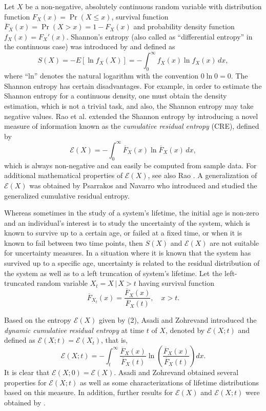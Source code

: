 \documentclass[11pt]{article}
\begin{document}
Let $X$ be a non-negative, absolutely continuous random variable with distribution function $F_X (x)=\Pr(X\leq x)$, survival function $\overline{F}_X (x)=\Pr(X>x)=1-F_X(x)$ and probability density function $f_X (x)=F_X'(x)$. Shannon's entropy (also called as “differential entropy” in the continuous case) was introduced by \cite{Shannon1948} and defined as  
\begin{equation} \textstyle
	S(X)=-E[\ln f_X (X)]=-\int_0^\infty f_X (x)\ln f_X (x)\,dx,
\end{equation}
where “ln” denotes the natural logarithm with the convention $0\ln 0=0$. The Shannon entropy has certain disadvantages. For example, in order to estimate the Shannon entropy for a continuous density, one must obtain the density estimation, which is not a trivial task, and also, the Shannon entropy may take negative values. Rao et al. \cite{Rao2004} extended the Shannon entropy by introducing a novel measure of information known as the \textit{cumulative residual entropy} (CRE), defined by
\begin{equation} \textstyle
	\mathcal{E}(X)=-\int_0^\infty \overline{F}_X (x)\ln \overline{F}_X (x)\,dx,
\end{equation}
which is always non-negative and can easily be computed from sample data. For additional mathematical properties of $\mathcal{E}(X)$, see also Rao \cite{Rao2005}. A generalization of $\mathcal{E}(X)$ was obtained by Psarrakos and Navarro \cite{Psarrakos2013} who introduced and studied the generalized cumulative residual entropy. 

Whereas sometimes in the study of a system's lifetime, the initial age is non-zero and an individual’s interest is to study the uncertainty of the system, which is known to survive up to a certain age, or failed at a fixed time, or when it is known to fail between two time points, then $S(X)$ and $\mathcal{E}(X)$ are not suitable for uncertainty measures.  
In a situation where it is known that the system has survived up to a specific age, uncertainty is related to the residual distribution of the system as well as to a left truncation of system's lifetime. Let the left-truncated random variable $X_t=X\,|\,X>t$ having survival function  
$$ \textstyle \overline{F}_{X_t}(x)=\frac{\overline{F}_X(x)}{\overline{F}_X(t)}, \quad x>t. $$

Based on the entropy $\mathcal{E}(X)$ given by (2), Asadi and Zohrevand \cite{Asadi2007} introduced the \textit{dynamic cumulative residual entropy} at time $t$ of $X$, denoted by $\mathcal{E}(X;t)$ and defined as $\mathcal{E}(X;t)=\mathcal{E}(X_t)$, that is,  
\begin{equation} \textstyle
	\mathcal{E}(X;t)=-\int_t^\infty \frac{\overline{F}_X (x)}{\overline{F}_X (t)} \ln\left(\frac{\overline{F}_X (x)}{\overline{F}_X (t)}\right) dx.
\end{equation}
It is clear that $\mathcal{E}(X;0)=\mathcal{E}(X)$. Asadi and Zohrevand \cite{Asadi2007} obtained several properties for $\mathcal{E}(X;t)$ as well as some characterizations of lifetime distributions based on this measure. In addition, further results for $\mathcal{E}(X)$ and $\mathcal{E}(X;t)$ were obtained by \cite{Navarro2010}.  
\end{document}
